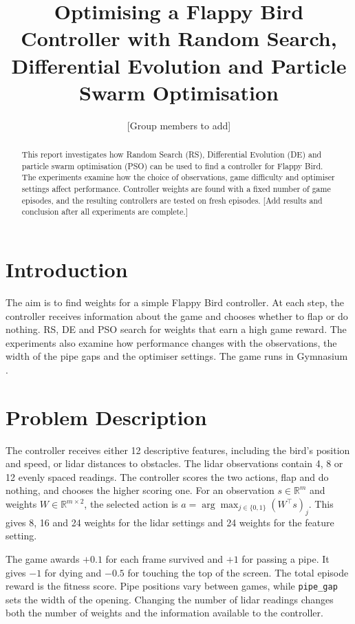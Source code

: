 \documentclass[runningheads]{llncs}
\begin{document}
\title{Optimising a Flappy Bird Controller with Random Search, Differential Evolution and Particle Swarm Optimisation}
\author{[Group members to add]}
\maketitle
\begin{abstract}
This report investigates how Random Search (RS), Differential Evolution (DE) and particle swarm optimisation (PSO) can be used to find a controller for Flappy Bird. The experiments examine how the choice of observations, game difficulty and optimiser settings affect performance. Controller weights are found with a fixed number of game episodes, and the resulting controllers are tested on fresh episodes. [Add results and conclusion after all experiments are complete.]
\end{abstract}

\section{Introduction}
The aim is to find weights for a simple Flappy Bird controller. At each step, the controller receives information about the game and chooses whether to flap or do nothing. RS, DE and PSO search for weights that earn a high game reward. The experiments also examine how performance changes with the observations, the width of the pipe gaps and the optimiser settings. The game runs in Gymnasium \cite{towers2024gymnasiumstandardinterfacereinforcement}.

\section{Problem Description}
The controller receives either 12 descriptive features, including the bird's position and speed, or lidar distances to obstacles. The lidar observations contain 4, 8 or 12 evenly spaced readings. The controller scores the two actions, flap and do nothing, and chooses the higher scoring one. For an observation $s\in\mathbb{R}^{m}$ and weights $W\in\mathbb{R}^{m\times 2}$, the selected action is $a=\arg\max_{j\in\{0,1\}}(W^\top s)_j$. This gives 8, 16 and 24 weights for the lidar settings and 24 weights for the feature setting.

The game awards $+0.1$ for each frame survived and $+1$ for passing a pipe. It gives $-1$ for dying and $-0.5$ for touching the top of the screen. The total episode reward is the fitness score. Pipe positions vary between games, while \texttt{pipe\_gap} sets the width of the opening. Changing the number of lidar readings changes both the number of weights and the information available to the controller.
\end{document}
